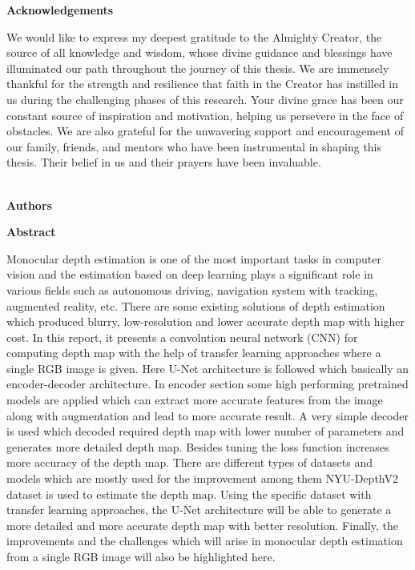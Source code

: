 \documentclass[a4paper,12pt,oneside]{book}
\newcommand{\HeadingR}[1]{%

{\fontsize{16}{19.2}\selectfont			%
\bfseries{#1}}
\vspace{35pt}
}
\begin{document}
\begin{center}
\HeadingR{Acknowledgements}
\end{center}
We would like to express my deepest gratitude to the Almighty Creator, the source of all knowledge and wisdom, whose divine guidance and blessings have illuminated our path throughout the journey of this thesis. We are immensely thankful for the strength and resilience that faith in the Creator has instilled in us during the challenging phases of this research. Your divine grace has been our constant source of inspiration and motivation, helping us persevere in the face of obstacles. We are also grateful for the unwavering support and encouragement of our family, friends, and mentors who have been instrumental in shaping this thesis. Their belief in us and their prayers have been invaluable.\\\\

\begin{flushright}
\textbf{Authors}
\end{flushright}

   
\newpage
{} \label{abstr}

\begin{center}
\HeadingR{Abstract}
\end{center}
Monocular depth estimation is one of the most important tasks in computer vision and the estimation based on deep learning plays a significant role in various fields
such as autonomous driving, navigation system with tracking, augmented reality, etc. There are some existing solutions of depth estimation which produced blurry, low-resolution and lower accurate depth map with higher cost. In this report, it presents a convolution neural network (CNN) for computing depth map with the help of transfer learning approaches where a single RGB image is given. Here U-Net architecture is followed which basically an encoder-decoder architecture. In encoder section some high performing pretrained models are applied which can extract more accurate features from the image along with augmentation and lead to more accurate result. A very simple decoder is used which decoded required depth map with lower number of parameters and generates more detailed depth map. Besides tuning the loss function increases more accuracy of the depth map. There are different types of datasets and models which are mostly used for the improvement among them NYU-DepthV2 dataset is used to estimate the depth map.
Using the specific dataset with transfer learning approaches, the U-Net architecture will be able to generate a more detailed and more accurate depth map with better resolution.
Finally, the improvements and  the challenges which will arise in monocular depth estimation from a single RGB image will also be highlighted here.
\end{document}
